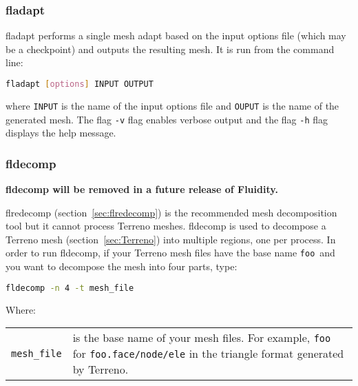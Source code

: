 
\subsubsection{fladapt}
\label{sec:fladapt}
fladapt performs a single mesh adapt based on the input options file (which may be a checkpoint) and outputs the resulting mesh. It is run from the command line:

\begin{lstlisting}[language = Bash]
fladapt [options] INPUT OUTPUT
\end{lstlisting}
where \lstinline[language = Bash]+INPUT+ is the name of the input options file and \lstinline[language = Bash]+OUPUT+ is the name of the generated mesh. The flag \lstinline[language = Bash]+-v+ flag enables verbose output and the flag \lstinline[language = Bash]+-h+ flag displays the help message.


\subsubsection{fldecomp}
\label{sec:fldecomp}

{\bf fldecomp will be removed in a future release of Fluidity.}

flredecomp (section~\ref{sec:flredecomp}) is the recommended mesh decomposition tool but it cannot process Terreno meshes.  fldecomp is used to decompose a Terreno mesh (section~\ref{sec:Terreno}) into multiple regions, one per
process. In order to run fldecomp, if your Terreno mesh files have the base name
\lstinline{foo}\ and you want to decompose the mesh into four parts, type:
\begin{lstlisting}[language = Bash]
fldecomp -n 4 -t mesh_file
\end{lstlisting}

Where:
\begin{center}
  \begin{tabular}{lp{}}
    \lstinline+mesh_file+ & is the base name of your mesh files. For
    example, \lstinline+foo+ for \lstinline+foo.face/node/ele+ in the triangle
    format generated by Terreno.
  \end{tabular}
\end{center}


